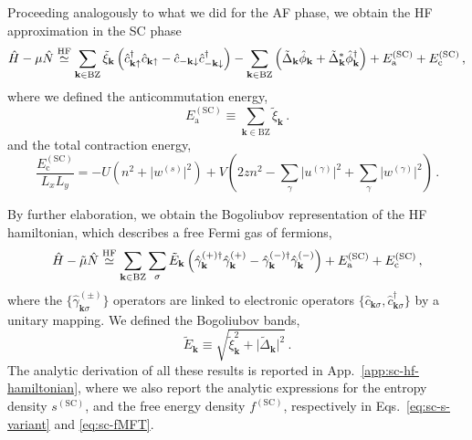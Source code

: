 Proceeding analogously to what we did for the AF phase, we obtain the HF approximation in the SC phase
\begin{equation}\label{eq:sc-H-approx}
	\hat H - \mu \hat N \stackrel{\mathrm{HF}}{\simeq} \sum_{\mathbf{k}\in\mathrm{BZ}} \tilde{\xi}_\mathbf{k} \left(
	\hat c_{\mathbf{k}\uparrow}^\dagger
	\hat c_{\mathbf{k}\uparrow} -
	\hat c_{-\mathbf{k}\downarrow}
	\hat c_{-\mathbf{k}\downarrow}^\dagger
	\right) - \sum_{\mathbf{k}\in\mathrm{BZ}} \left(
	\tilde{\Delta}_\mathbf{k}
	\hat \phi_\mathbf{k} + \tilde{\Delta}_\mathbf{k}^* \hat \phi_\mathbf{k}^\dagger
	\right) + E_\mathrm{a}^{(\mathrm{SC})} + E_\mathrm{c}^{(\mathrm{SC})} \, ,
\end{equation}
where we defined the anticommutation energy,
\begin{equation}\label{eq:sc-anticommutation-energy}
	E_\mathrm{a}^{(\mathrm{SC})} \equiv \sum_{\mathbf{k}\in\mathrm{BZ}} \tilde{\xi}_\mathbf{k} \, .
\end{equation}
and the total contraction energy,
\begin{equation}\label{eq:sc-Ec}
	\frac{E_\mathrm{c}^{(\mathrm{SC})}}{L_x L_y} = -U \left(
	n^2 + \big|
	w^{(s)}
	\big|^2
	\right) + V \left(
	2zn^2 - \sum_\gamma \big|
	u^{(\gamma)}
	\big|^2 + \sum_\gamma \big|
	w^{(\gamma)}
	\big|^2
	\right) \, .
\end{equation}

By further elaboration, we obtain the Bogoliubov representation of the HF hamiltonian, which describes a free Fermi gas of fermions,
\begin{equation}\label{eq:sc-H-bogoliubov}
	\hat H - \tilde{\mu} \hat N \stackrel{\mathrm{HF}}{\simeq} \sum_{\mathbf{k} \in \mathrm{BZ}} \sum_\sigma \tilde{E}_\mathbf{k} \left(
	\hat \gamma_\mathbf{k}^{(+)\dagger} \hat \gamma_\mathbf{k}^{(+)} - \hat \gamma_\mathbf{k}^{(-)\dagger} \hat \gamma_\mathbf{k}^{(-)}
	\right) + E_\mathrm{a}^{(\mathrm{SC})} + E_\mathrm{c}^{(\mathrm{SC})} \, ,
\end{equation}
where the $\lbrace \hat \gamma_{\mathbf{k}\sigma}^{(\pm)} \rbrace$ operators are linked to electronic operators $\lbrace \hat c_{\mathbf{k}\sigma}, \hat c_{\mathbf{k}\sigma}^\dagger \rbrace$ by a unitary mapping. We defined the Bogoliubov bands,
\begin{equation}\label{eq:sc-bands}
	\tilde{E}_\mathbf{k} \equiv \sqrt{\tilde{\xi}_\mathbf{k}^2 + \big| \tilde{\Delta}_\mathbf{k}\big|^2} \, .
\end{equation}
The analytic derivation of all these results is reported in App.~\ref{app:sc-hf-hamiltonian}, where we also report the analytic expressions for the entropy density $s^{(\mathrm{SC})}$, and the free energy density $f^{(\mathrm{SC})}$, respectively in Eqs.~\eqref{eq:sc-s-variant} and \eqref{eq:sc-fMFT}.

